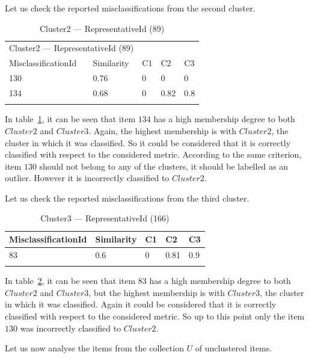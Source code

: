 Let us check the reported misclassifications from the second cluster.

\begin{table}[h!]
\begin{tabular}{lllll}
\hline
\multicolumn{2}{c}{Cluster2 --- RepresentativeId (89)} \\
\cline{1-5}
MisclassificationId & Similarity  & C1 & C2 & C3\\ 
\hline
130 & 0.76 & 0 & 0 & 0\\
134 & 0.68 & 0 & 0.82 & 0.8\\
\hline \\
\end{tabular} 
\caption{Cluster2 --- RepresentativeId (89)}
\label{tab:cluster2id89}
\end{table}

In table~\ref{tab:cluster2id89}, it can be seen that item $134$ has a high membership degree to both $Cluster2$ and $Cluster3$. Again, the highest membership is with $Cluster2$, the cluster in which it was classified. So it could be considered that it is correctly classified with respect to the considered metric. According to the same criterion, item $130$ should not belong to any of the clusters, it should be labelled as an outlier. However it is incorrectly classified to $Cluster2$. 

Let us check the reported misclassifications from the third cluster.

\begin{table}[h!]
\begin{tabular}{lllll}
\cline{1-5}
MisclassificationId & Similarity  & C1 & C2 & C3\\ 
\hline
83 & 0.6 & 0 & 0.81 & 0.9\\
\hline \\
\end{tabular} 
\caption{Cluster3 --- RepresentativeId (166)}
\label{tab:cluster3id166}
\end{table}

In table~\ref{tab:cluster3id166}, it can be seen that item $83$ has a high membership degree to both $Cluster2$ and $Cluster3$, but the highest membership is with $Cluster3$, the cluster in which it was classified. Again it could be considered that it is correctly classified with respect to the considered metric. So up to this point only the item $130$ was incorrectly classified to $Cluster2$.

Let us now analyse the items from the collection $U$ of unclustered items.

